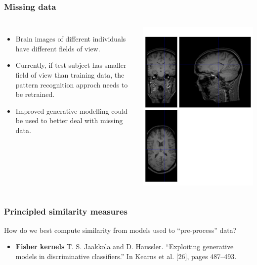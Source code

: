 \begin{frame}
\frametitle{Missing data}
\begin{columns}
\begin{itemize}
\item Brain images of different individuals have different fields of view.
\item Currently, if test subject has smaller field of view than training data, the pattern recognition approch needs to be retrained.
\item Improved generative modelling could be used to better deal with missing data.
\end{itemize}
\includegraphics[width=\textwidth]{missing_slices}
\end{columns}
\end{frame}

\begin{frame}
\frametitle{Principled similarity measures}
How do we best compute similarity from models used to ``pre-process'' data?
\begin{itemize}
\item {\bf Fisher kernels} T. S. Jaakkola and D. Haussler. ``Exploiting generative models in discriminative classifiers.'' In Kearns et al. [26], pages 487--493.
\end{itemize}
\end{frame}

